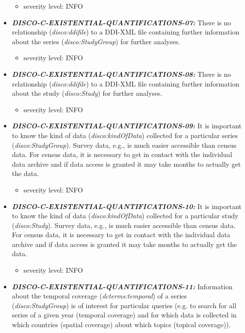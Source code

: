 \documentclass{llncs}
\begin{document}
\begin{itemize}
\begin{itemize}
		\item severity level: INFO
	\end{itemize}
	\item \textbf{{\em DISCO-C-EXISTENTIAL-QUANTIFICATIONS-07:}} 
  There is no relationship (\emph{disco:ddifile}) to a DDI-XML file containing further information about the series (\emph{disco:StudyGroup}) for further analyses.
	\begin{itemize}
		\item severity level: INFO
	\end{itemize}
	\item \textbf{{\em DISCO-C-EXISTENTIAL-QUANTIFICATIONS-08:}} 
  There is no relationship (\emph{disco:ddifile}) to a DDI-XML file containing further information about the study (\emph{disco:Study}) for further analyses.
	\begin{itemize}
		\item severity level: INFO
	\end{itemize}
	\item \textbf{{\em DISCO-C-EXISTENTIAL-QUANTIFICATIONS-09:}} 
  It is important to know the kind of data (\emph{disco:kindOfData}) collected for a particular series (\emph{disco:StudyGroup}).
	Survey data, e.g., is much easier accessible than census data. 
	For census data, it is necessary to get in contact with the individual data archive and if data access is granted it may take months to actually get the data.
	\begin{itemize}
		\item severity level: INFO
	\end{itemize}
	\item \textbf{{\em DISCO-C-EXISTENTIAL-QUANTIFICATIONS-10:}}
  It is important to know the kind of data (\emph{disco:kindOfData}) collected for a particular study (\emph{disco:Study}).
	Survey data, e.g., is much easier accessible than census data. 
	For census data, it is necessary to get in contact with the individual data archive and if data access is granted it may take months to actually get the data.
	\begin{itemize}
		\item severity level: INFO
	\end{itemize}
	\item \textbf{{\em DISCO-C-EXISTENTIAL-QUANTIFICATIONS-11:}} 
  Information about the temporal coverage (\emph{dcterms:temporal}) of a series (\emph{disco:StudyGroup}) is of interest for particular queries 
	(e.g. to search for all series of a given year (temporal coverage) and for which data is collected in which countries (spatial coverage) about which topics (topical coverage)).

\end{itemize}
\end{document}
